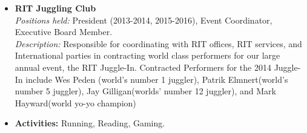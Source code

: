\documentclass[10pt]{article}
\begin{document}
\vspace{1ex}
\begin{itemize} [topsep=.5ex, itemsep=0ex, partopsep=0ex, parsep=1ex]
	\item[] {\bf RIT Juggling Club}\\
	{\it Positions held:}  President (2013-2014, 2015-2016), Event Coordinator, Executive Board Member.\\
	{\it Description:} Responsible for coordinating with RIT offices, RIT services, and International parties in contracting world class performers for our large annual event, the RIT Juggle-In. Contracted Performers for the 2014 Juggle-In include Wes Peden (world's number 1 juggler), Patrik Elmnert(world's number 5 juggler), Jay Gilligan(worlds' number 12 juggler), and Mark Hayward(world yo-yo champion)  	
	\item[] {\bf Activities:} Running, Reading, Gaming.
\end{itemize}
\end{document}
